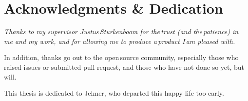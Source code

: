 
\begingroup
  \let\clearpage\relax
  \let\cleardoublepage\relax
  \chapter*{Acknowledgments \& Dedication}

  \itshape
  Thanks to my supervisor Justus\,Sturkenboom for the\,trust (and
    the\,patience) in me and my work, and for allowing me to produce
    a\,product I\,am pleased with.

  \medskip
  \noindent In addition, thanks go out to the open\,source community,
    especially those who raised issues or submitted pull request, and those
    who have not done so yet, but will.

  \medskip
  \noindent This thesis is dedicated to Jelmer, who departed this happy life
    too early.
\endgroup
